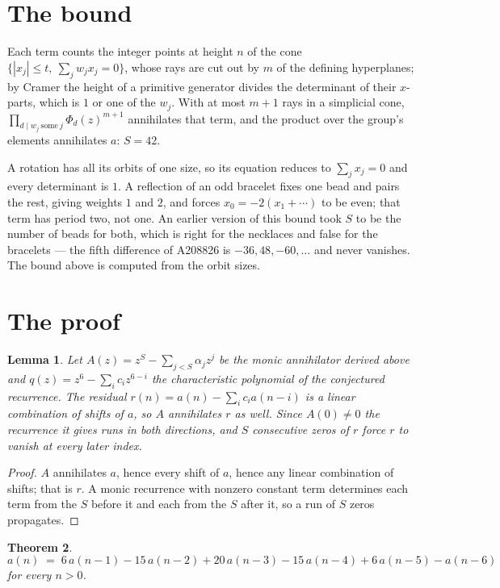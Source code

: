\documentclass[11pt,a4paper]{article}
\theoremstyle{plain}
\newtheorem{theorem}{Theorem}
\newtheorem{lemma}[theorem]{Lemma}
\theoremstyle{definition}
\begin{document}
\section{The bound}

Each term counts the integer points at height $n$ of the cone
$\{|x_j|\le t,\ \sum_j w_jx_j=0\}$, whose rays are cut out by $m$ of the defining
hyperplanes; by Cramer the height of a primitive generator divides the determinant of their
$x$-parts, which is $1$ or one of the $w_j$. With at most $m+1$ rays in a simplicial cone,
$\prod_{d\mid w_j\ \text{some}\ j}\Phi_d(z)^{m+1}$ annihilates that term, and the product
over the group's elements annihilates $a$: $S=42$.

A rotation has all its orbits of one size, so its equation reduces to $\sum_jx_j=0$ and every
determinant is $1$. A reflection of an odd bracelet fixes one bead and pairs the rest, giving
weights $1$ and $2$, and forces $x_0=-2(x_1+\cdots)$ to be even; that term has period two, not
one. An earlier version of this bound took $S$ to be the number of beads for both, which is
right for the necklaces and false for the bracelets --- the fifth difference of A208826 is
$-36, 48, -60, \dots$ and never vanishes. The bound above is computed from the orbit sizes.

\section{The proof}

\begin{lemma}\label{lem:crit}
Let $A(z)=z^S-\sum_{j<S}\alpha_jz^{j}$ be the monic annihilator derived above and
$q(z)=z^{6}-\sum_ic_iz^{6-i}$ the characteristic polynomial of the conjectured
recurrence. The residual $r(n)=a(n)-\sum_ic_ia(n-i)$ is a linear combination of shifts of $a$,
so $A$ annihilates $r$ as well. Since $A(0)\ne0$ the recurrence it gives runs in both
directions, and $S$ consecutive zeros of $r$ force $r$ to vanish at every later index.
\end{lemma}

\begin{proof}
$A$ annihilates $a$, hence every shift of $a$, hence any linear combination of shifts; that is
$r$. A monic recurrence with nonzero constant term determines each term from the $S$ before it
and each from the $S$ after it, so a run of $S$ zeros propagates.
\end{proof}

\begin{theorem}
\[
a(n)\;=\;6\,a(n-1) - 15\,a(n-2) + 20\,a(n-3) - 15\,a(n-4) + 6\,a(n-5) - a(n-6)
\]
for every $n>0$.
\end{theorem}
\end{document}
